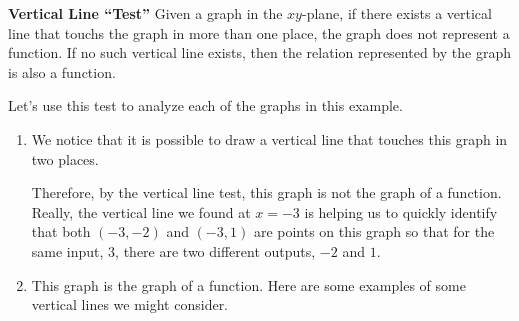 \documentclass[noauthor, nooutcomes]{ximera}
\begin{document}
\begin{example}
\begin{explanation}
\begin{callout}\textbf{Vertical Line ``Test''}  
Given a graph in the $xy$-plane, if there exists a vertical line that touchs the graph in more than one place, the graph does not represent a function.  If no such vertical line exists, then the relation represented by the graph is also a function.
\end{callout}

Let's use this test to analyze each of the graphs in this example.
\begin{enumerate}[label=\alph*.]
\item  We notice that it is possible to draw a vertical line that touches this graph in two places.

\begin{image}
\end{image}

Therefore, by the vertical line test, this graph is not the graph of a function.  Really, the vertical line we found at $x=-3$ is helping us to quickly identify that both $(-3,-2)$ and $(-3, 1)$ are points on this graph so that for the same input, $3$, there are two different outputs, $-2$ and $1$. 

\item This graph is the graph of a function.  Here are some examples of some vertical lines we might consider.

 \begin{image}
 \end{image}
 

\end{enumerate}
\end{explanation}
\end{example}
\end{document}
